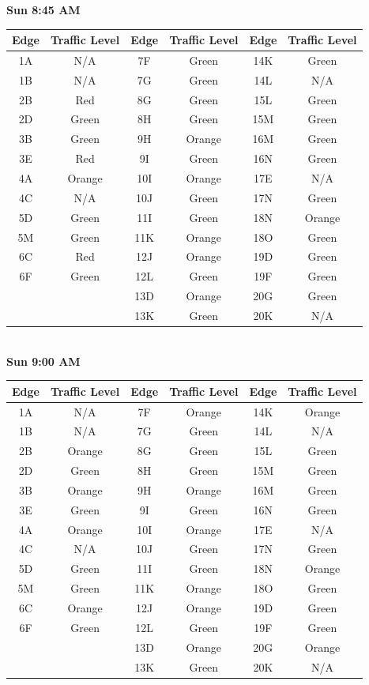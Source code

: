 \documentclass{article}
\begin{document}
\textbf{Sun 8:45 AM} \\

\begin{tabular}{|c|c||c|c||c|c|}\hline
Edge & Traffic Level & Edge & Traffic Level & Edge & Traffic Level \\ \hline
1A & N/A & 7F & Green & 14K & Green \\ 
1B & N/A & 7G & Green & 14L & N/A \\ \hline
2B & Red & 8G & Green & 15L & Green \\ 
2D & Green & 8H & Green & 15M & Green \\ \hline
3B & Green & 9H & Orange & 16M & Green \\ 
3E & Red & 9I & Green & 16N & Green \\ \hline 
4A & Orange & 10I & Orange & 17E & N/A \\ 
4C & N/A & 10J & Green & 17N & Green \\ \hline
5D & Green & 11I & Green & 18N & Orange \\ 
5M & Green & 11K & Orange & 18O & Green \\ \hline 
6C & Red & 12J & Orange & 19D & Green \\ 
6F & Green & 12L & Green & 19F & Green \\ \hline 
& & 13D & Orange & 20G & Green \\
& & 13K & Green & 20K & N/A \\ \hline
\end{tabular} \\

\textbf{Sun 9:00 AM} \\

\begin{tabular}{|c|c||c|c||c|c|}\hline
Edge & Traffic Level & Edge & Traffic Level & Edge & Traffic Level \\ \hline
1A & N/A & 7F & Orange & 14K & Orange \\ 
1B & N/A & 7G & Green & 14L & N/A \\ \hline
2B & Orange & 8G & Green & 15L & Green \\ 
2D & Green & 8H & Green & 15M & Green \\ \hline
3B & Orange & 9H & Orange & 16M & Green \\ 
3E & Green & 9I & Green & 16N & Green \\ \hline 
4A & Orange & 10I & Orange & 17E & N/A \\ 
4C & N/A & 10J & Green & 17N & Green \\ \hline
5D & Green & 11I & Green & 18N & Orange \\ 
5M & Green & 11K & Orange & 18O & Green \\ \hline 
6C & Orange & 12J & Orange & 19D & Green \\ 
6F & Green & 12L & Green & 19F & Green \\ \hline 
& & 13D & Orange & 20G & Orange \\
& & 13K & Green & 20K & N/A \\ \hline
\end{tabular} \\
\end{document}
